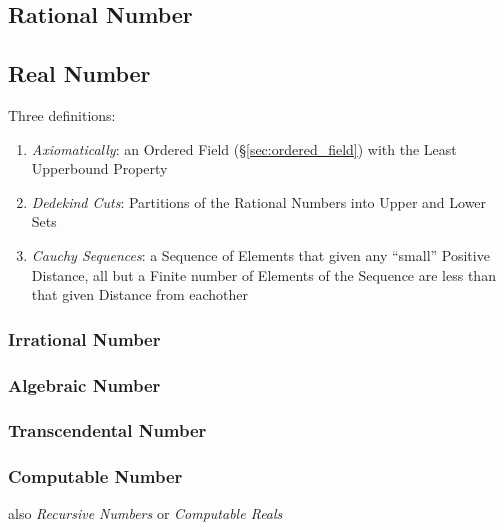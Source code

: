 \subsection{Rational Number}\label{sec:rational}

\subsection{Real Number}\label{sec:real_number}

Three definitions:
\begin{enumerate}
  \item \emph{Axiomatically}: an Ordered Field
    (\S\ref{sec:ordered_field}) with the Least Upperbound Property
  \item \emph{Dedekind Cuts}: Partitions of the Rational Numbers into
    Upper and Lower Sets
  \item \emph{Cauchy Sequences}: a Sequence of Elements that given any
    ``small'' Positive Distance, all but a Finite number of Elements
    of the Sequence are less than that given Distance from eachother
\end{enumerate}

\subsubsection{Irrational Number}\label{sec:irrational}

\subsubsection{Algebraic Number}\label{sec:algebraic_number}

\subsubsection{Transcendental Number}\label{sec:transcendental}

\subsubsection{Computable Number}\label{sec:computable_real}

also \emph{Recursive Numbers} or \emph{Computable Reals}

